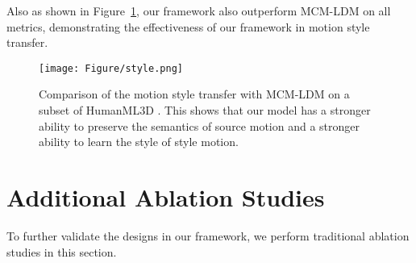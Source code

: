 \begin{table}[!h]
\caption{Evaluation of motion in-between with CondMDI \cite{cohan2024flexible} on HumanML3D \cite{Guo_2022_CVPR} dataset.}
\label{tab:inbetween}
\vspace{-5mm}
\end{table}

Also as shown in Figure~\ref{fig:style}, our framework also outperform MCM-LDM on all metrics, demonstrating the effectiveness of our framework in motion style transfer.

\begin{figure}[!h]
  \centering
  \texttt{[image: Figure/style.png]}
  \caption{Comparison of the motion style transfer with MCM-LDM \cite{Song_2024_CVPR} on a subset of HumanML3D \cite{Guo_2022_CVPR}. This shows that our model has a stronger ability to preserve the semantics of source motion and a stronger ability to learn the style of style motion.}
  \label{fig:style}
\end{figure} 

\section{Additional Ablation Studies}
\label{sec:add_ablation}
To further validate the designs in our framework, we perform traditional ablation studies in this section.

